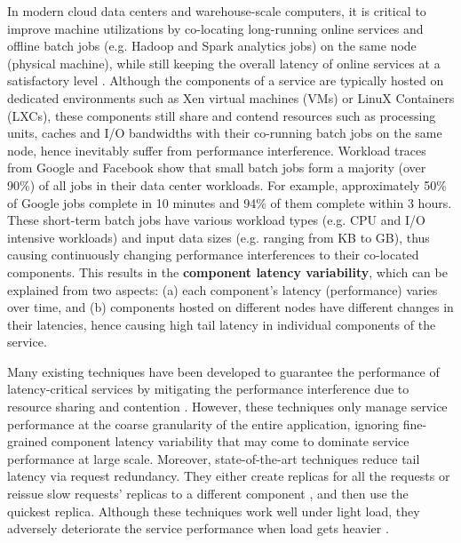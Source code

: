 \documentclass[10pt, conference, compsocconf]{IEEEtran}
\begin{document}
In modern cloud data centers and warehouse-scale computers, it is critical to improve machine utilizations by co-locating long-running online services and offline batch jobs (e.g. Hadoop \cite{HadoopWebsite} and Spark \cite{SparkWebsite} analytics jobs) on the same node (physical machine), while still keeping the overall latency of online services at a satisfactory level \cite{reiss2012heterogeneity,yang2013bubble}.
Although the components of a service are typically hosted on dedicated environments such as Xen virtual machines (VMs) or LinuX Containers (LXCs), these components still share and contend resources such as processing units, caches and I/O bandwidths with their co-running batch jobs on the same node, hence inevitably suffer from performance interference. Workload traces from Google \cite{reiss2012heterogeneity} and Facebook \cite{chen2012interactive} show that small batch jobs form a majority (over 90\%) of all jobs in their data center workloads. For example, approximately 50\% of Google jobs complete in 10 minutes and 94\% of them complete within 3 hours.
These short-term batch jobs have various workload types (e.g. CPU and I/O intensive workloads) and input data sizes (e.g. ranging from KB to GB), thus causing continuously changing performance interferences to their co-located components. This results in the \textbf{component latency variability}, which can be explained from two aspects: (a) each component's latency (performance) varies over time, and (b) components hosted on different nodes have different changes in their latencies, hence causing high tail latency in individual components of the service.














Many existing techniques have been developed to guarantee the performance of latency-critical services by mitigating the performance interference due to resource sharing and contention \cite{kasture2014ubik,xu2013bobtail,ahn2012dynamic,xu2010mitigating}. However, these techniques only manage service performance at the coarse granularity of the entire application, ignoring fine-grained component latency variability that may come to dominate service performance at large scale. Moreover, state-of-the-art techniques reduce tail latency via request redundancy. They either create replicas for all the requests \cite{vulimiri2012more,ananthanarayanan2013effective,stewart2013zoolander} or reissue slow requests' replicas to a different component \cite{jalaparti2013speeding, tailatScale}, and then use the quickest replica. Although these techniques work well under light load, they adversely deteriorate the service performance when load gets heavier \cite{shah2013redundant}.
\end{document}
